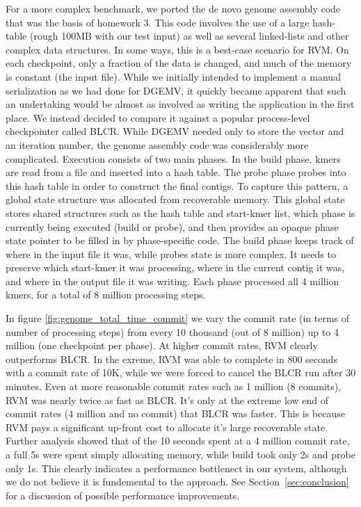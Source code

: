For a more complex benchmark, we ported the de novo genome assembly code that
was the basis of homework 3. This code involves the use of a large hash-table
(rough 100MB with our test input) as well as several linked-lists and other
complex data structures. In some ways, this is a best-case scenario for RVM. On
each checkpoint, only a fraction of the data is changed, and much of the memory
is constant (the input file). While we initially intended to implement a manual
serialization as we had done for DGEMV, it quickly became apparent that such an
undertaking would be almost as involved as writing the application in the first
place. We instead decided to compare it against a popular process-level
checkpointer called BLCR\cite{BLCR}. While DGEMV needed only to store the vector
and an iteration number, the genome assembly code was considerably more
complicated. Execution consists of two main phases. In the build phase, kmers
are read from a file and inserted into a hash table. The probe phase probes into
this hash table in order to construct the final contigs. To capture this
pattern, a global state structure was allocated from recoverable memory. This
global state stores shared structures such as the hash table and start-kmer
list, which phase is currently being executed (build or probe), and then
provides an opaque phase state pointer to be filled in by phase-specific code.
 The build phase keeps track of where in the input file it was, while probes
state is more complex. It needs to preserve which start-kmer it was
processing, where in the current contig it was, and where in the output file it
was writing. Each phase processed all 4 million kmers, for a total of 8 million
processing steps.

In figure \ref{fig:genome_total_time_commit} we vary the commit rate (in terms of number of
processing steps) from every 10 thousand (out of 8 million) up to 4 million
(one checkpoint per phase). At higher commit rates, RVM clearly outperforms
BLCR. In the exreme, RVM was able to complete in 800 seconds with a commit rate
of 10K, while we were forced to cancel the BLCR run after 30 minutes. Even at
more reasonable commit rates such as 1 million (8 commits), RVM was nearly twice
as fast as BLCR. It's only at the extreme low end of commit rates (4 million
and no commit) that BLCR was faster. This is because RVM pays a significant
up-front cost to allocate it's large recoverable state. Further analysis showed
that of the 10 seconds spent at a 4 million commit rate, a full 5s were spent
simply allocating memory, while build took only 2s and probe only 1s. This
clearly indicates a performance bottlenect in our system, although we do not
believe it is fundemental to the approach. See Section~\ref{sec:conclusion} for a
discussion of possible performance improvements. 

